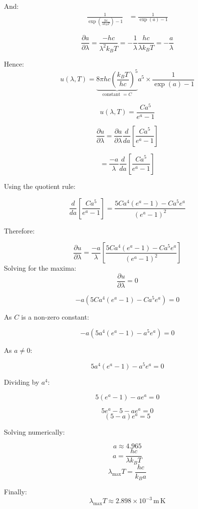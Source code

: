 And:
\begin{align*}
    \frac{1}{\exp{\left(\frac{hc}{\lambda k_B T}\right)} - 1}
    &= \frac{1}{\exp(a) - 1}
\end{align*}

\[
    \frac{\partial a}{\partial \lambda}
    =
    \frac{-hc}{\lambda^2 k_B T}
    =
    - \frac{1}{\lambda}\frac{hc}{\lambda k_B T}
    =
    -\frac{a}{\lambda}
\]

Hence:
\[
    u(\lambda, T)
    =
    \underbrace{8 \pi hc \left(\frac{k_B T}{hc}\right)^5}_{\text{constant } = C}
    a^5 \times \frac{1}{\exp(a) - 1}
\]

\[
    u(\lambda, T) = \frac{C a^5}{e^a - 1}
\]

\[
    \frac{\partial u}{\partial \lambda}
    =
    \frac{\partial a}{\partial \lambda}
    \frac{d}{da}
    \left[
        \frac{C a^5}{e^a - 1}
    \right]
\]

\[
    =
    \frac{-a}{\lambda}
    \frac{d}{da}
    \left[
        \frac{C a^5}{e^a - 1}
    \right]
\]

Using the quotient rule:

\[
    \frac{d}{da}
    \left[
        \frac{C a^5}{e^a - 1}
    \right]
    =
    \frac{5C a^4 (e^a - 1) - C a^5 e^a}{(e^a - 1)^2}
\]

Therefore:

\[
    \frac{\partial u}{\partial \lambda}
    =
    \frac{-a}{\lambda}
    \left[
        \frac{5C a^4 (e^a - 1) - C a^5 e^a}{(e^a - 1)^2}
    \right]
\]
Solving for the maxima:
\[
    \frac{\partial u}{\partial \lambda} = 0
\]

\[
    -a \left(5Ca^4(e^a - 1) - Ca^5 e^a\right) = 0
\]

As $C$ is a non-zero constant:

\[
    -a \left(5a^4(e^a - 1) - a^5 e^a\right) = 0
\]

As $a \neq 0$:

\[
    5a^4(e^a - 1) - a^5 e^a = 0
\]

Dividing by $a^4$:

\[
    5(e^a - 1) - a e^a = 0
\]

\[
    5e^a - 5 - a e^a = 0
\]
\[
    (5 - a)e^a = 5
\]

Solving numerically:

\[
    a \approx 4.965
\]
\[
    a = \frac{hc}{\lambda k_B T}
\]
\[
    \lambda_{\max} T = \frac{hc}{k_B a}
\]

Finally:
\[
    \lambda_{\max} T \approx 2.898 \times 10^{-3} \, \mathrm{m\,K}
\]